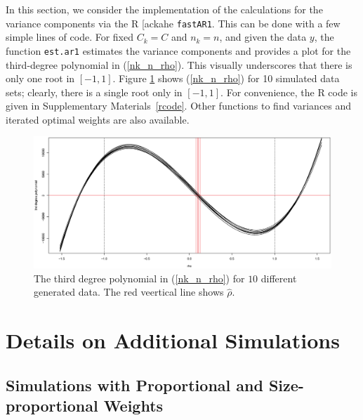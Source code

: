 \documentclass[11pt,a5paper,twoside]{book}
\begin{document}
{In this section, we consider the implementation of the calculations for the variance components via the R [ackahe {\tt{fastAR1}}. This can be done with a few simple lines of code. For fixed $C_k=C$ and $n_k=n$, and given the data $y$, the function {\tt{est.ar1}} estimates the variance components and provides a plot for the third-degree polynomial in (\ref{nk_n_rho}). This visually underscores that there is only one root in $[-1,1]$. Figure \ref{3rd_poly} shows (\ref{nk_n_rho}) for 10 simulated data sets;  clearly, there is a single root only in $[-1,1]$. For convenience, the R code is given in Supplementary Materials~\ref{rcode}. Other functions to find variances and iterated optimal weights are also available.
\begin{figure}[t]
\centering
\includegraphics[width=\textwidth]{3rd_poly.eps}
\caption{The third degree polynomial in (\ref{nk_n_rho}) for $10$ different generated data. The red veertical line shows $\widehat{\rho}$.} \label{3rd_poly}
\end{figure}

\section{Details on Additional Simulations\label{suppsimul}}

\subsection{Simulations with Proportional and Size-proportional Weights}

}
\end{document}
